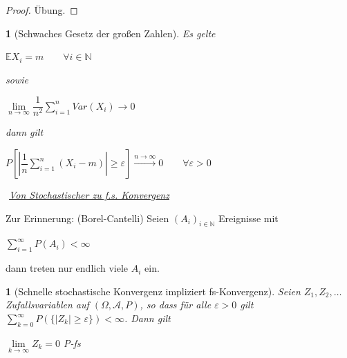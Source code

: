 \documentclass[10pt,a4paper]{report}
\numberwithin{equation}{section}
\numberwithin{figure}{section}
\theoremstyle{plain}
\theoremstyle{definition}
\theoremstyle{remark}
\theoremstyle{plain}
\newtheorem{lem}[thm]{\protect\lemmaname}
\newtheorem{prop}[thm]{\protect\propositionname}
\providecommand{\lemmaname}{Lemma}
\providecommand{\propositionname}{Satz}
\newcommand{\1}{ \mathbb{1} } %
\begin{document}
\begin{proof}
  Übung. 
\end{proof}
\begin{prop}[Schwaches Gesetz der großen Zahlen] 
  Es gelte
  \begin{center}
    $\mathbb{E}X_i=m\qquad \forall i \in \mathbb{N}$
  \end{center}
  sowie
  \begin{center}
    $\lim\limits_{n \to \infty}
    \dfrac{1}{n^2}\sum\limits_{i=1}^nVar(X_i) \to 0$
  \end{center}
  dann gilt
  \begin{center}
    $P\left[\left|\dfrac{1}{n}\sum\limits_{i=1}^n(X_i-m)\right|\geq
      \varepsilon\right] \overset{n \to \infty}{\to} 0 \qquad \forall
    \varepsilon >0$
  \end{center}
  $ $
  \underline{Von Stochastischer zu f.s. Konvergenz}
\end{prop}
Zur Erinnerung: (Borel-Cantelli) Seien $(A_i)_{i \in \mathbb{N}}$ Ereignisse mit
\begin{center}
  $\sum\limits_{i=1}^\infty P(A_i) < \infty $
\end{center} 
dann treten nur endlich viele $A_i$ ein.
\begin{lem}[Schnelle stochastische Konvergenz impliziert fs-Konvergenz] 
  Seien $Z_1, Z_2,\ldots$ Zufallsvariablen auf $(\Omega,\mathcal{A},P)$, so dass
  für alle $\varepsilon >0$ gilt $\sum\limits_{k=0}^\infty P(\{|Z_k|\geq
  \varepsilon\})< \infty $. Dann gilt
  \begin{center}
    $\lim\limits_{k \to \infty} Z_k=0$ P-fs
  \end{center}
\end{lem}
\end{document}

